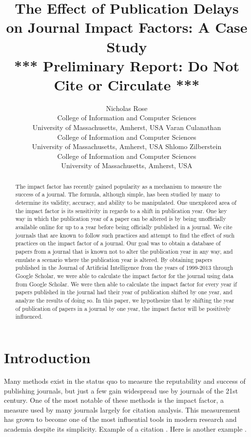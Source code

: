 \documentclass[jair,twoside,11pt,theapa]{article}
\title{The Effect of Publication Delays on Journal Impact Factors: A Case Study\\[12pt]
*** Preliminary Report: Do Not Cite or Circulate ***}
\author{\name Nicholas Rose \email {njrose@umass.edu} \\
	\addr College of Information and Computer Sciences\\
	University of Massachusetts, Amherst, USA  \AND
	\name Varan Culanathan \email {vculanathan@umass.edu} \\
       \addr College of Information and Computer Sciences\\
       University of Massachusetts, Amherst, USA  \AND
       \name Shlomo Zilberstein \email {shlomo@cs.umass.edu} \\
       \addr College of Information and Computer Sciences\\
       University of Massachusetts, Amherst, USA \\
      }
\begin{document}
\maketitle

\begin{abstract}
The impact factor has recently gained popularity as a mechanism to measure the success of a journal. The formula, although simple, has been studied by many to determine its validity, accuracy, and ability to be manipulated. One unexplored area of the impact factor is its sensitivity in regards to a shift in publication year. One key way in which the publication year of a paper can be altered is by being unofficially available online for up to a year before being officially published in a journal. We cite journals that are known to follow such practices and attempt to find the effect of such practices on the impact factor of a journal. Our goal was to obtain a database of papers from a journal that is known not to alter the publication year in any way, and emulate a scenario where the publication year is altered. By obtaining papers published in the Journal of Artificial Intelligence from the years of 1999-2013 through Google Scholar, we were able to calculate the impact factor for the journal using data from Google Scholar. We were then able to calculate the impact factor for every year if papers published in the journal had their year of publication shifted by one year, and analyze the results of doing so. In this paper, we hypothesize that by shifting the year of publication of papers in a journal by one year, the impact factor will be positively influenced.     
\end {abstract}


\section{Introduction}


Many methods exist in the status quo to measure the reputability and success of publishing journals, but just a few gain widespread use by journals of the 21st century. One of the most notable of these methods is the impact factor, a measure used by many journals largely for citation analysis. This measurement has grown to become one of the most influential tools in modern research and academia despite its simplicity.  
Example of a citation \cite{Tort2012}.  Here is another example \cite{Bjork2013}.
\end{document}

